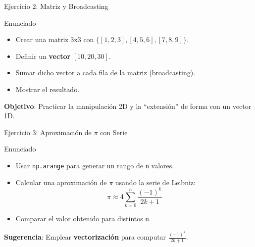 \documentclass[10pt]{beamer}
\begin{document}
\begin{frame}{Ejercicio 2: Matriz y Broadcasting}
  \begin{block}{Enunciado}
    \begin{itemize}
      \item Crear una matriz 3x3 con \(\{[1,2,3],[4,5,6],[7,8,9]\}\).
      \item Definir un \textbf{vector} \([10, 20, 30]\).
      \item Sumar dicho vector a cada fila de la matriz (broadcasting).
      \item Mostrar el resultado.
    \end{itemize}
  \end{block}
  \textbf{Objetivo}: Practicar la manipulación 2D y la “extensión” de forma con un vector 1D.
\end{frame}

\begin{frame}{Ejercicio 3: Aproximación de \(\pi\) con Serie}
  \begin{block}{Enunciado}
    \begin{itemize}
      \item Usar \texttt{np.arange} para generar un rango de \texttt{n} valores.
      \item Calcular una aproximación de \(\pi\) usando la serie de Leibniz:
      \[
        \pi \approx 4 \sum_{k=0}^{n} \frac{(-1)^k}{2k+1}
      \]
      \item Comparar el valor obtenido para distintos \texttt{n}.
    \end{itemize}
  \end{block}
  \textbf{Sugerencia}: Emplear \textbf{vectorización} para computar \(\frac{(-1)^k}{2k+1}\).
\end{frame}
\end{document}
